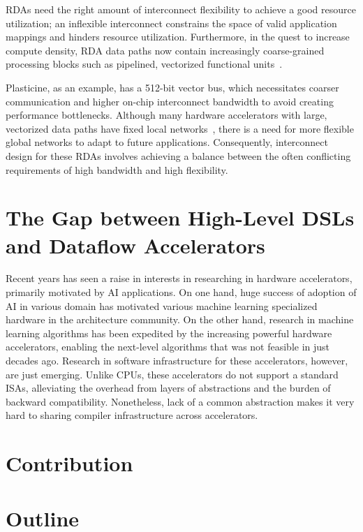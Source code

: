 RDAs need the right amount of interconnect flexibility to achieve a good resource utilization; 
an inflexible interconnect constrains the space of
valid application mappings and hinders resource utilization. 
Furthermore, 
in the quest to increase compute density, RDA data paths now 
contain increasingly coarse-grained processing blocks such as pipelined, vectorized functional 
units~\cite{plasticine, piperench, xilinx-acap}.

Plasticine, as an example, has a 512-bit vector bus, which necessitates coarser communication 
and higher on-chip interconnect bandwidth to avoid creating performance bottlenecks. 
Although many hardware accelerators with large, vectorized data paths have fixed local networks~\cite{brainwave}, there is a need for more
flexible global networks to adapt to future applications.
Consequently, interconnect design for these RDAs involves achieving a balance between the often conflicting requirements of high bandwidth and high flexibility.

\section{The Gap between High-Level DSLs and Dataflow Accelerators}
Recent years has seen a raise in interests in researching in hardware accelerators, primarily
motivated by AI applications. 
On one hand, huge success of adoption of AI in various domain has motivated various machine learning
specialized hardware in the architecture community.
On the other hand, research in machine learning algorithms has been expedited by the increasing
powerful hardware accelerators, enabling the next-level algorithms that was not feasible in just
decades ago.
Research in software infrastructure for these accelerators, however, are just emerging.
Unlike CPUs, these accelerators do not support a standard ISAs, alleviating the overhead from
layers of abstractions and the burden of backward compatibility. 
Nonetheless, lack of a common abstraction makes it very hard to sharing compiler infrastructure
across accelerators. 

\section{Contribution}
\section{Outline}
